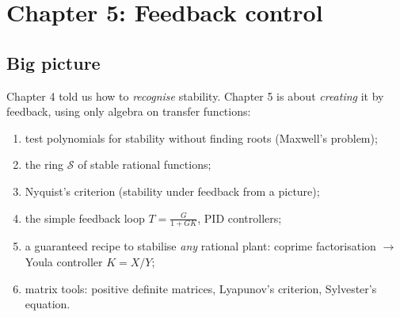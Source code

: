 \section{Chapter 5: Feedback control \texorpdfstring{}{}}
\label{ch5}

\subsection*{Big picture}
Chapter 4 told us how to \emph{recognise} stability. Chapter 5 is about \emph{creating} it by feedback, using only algebra on transfer functions:
\begin{enumerate}
\item test polynomials for stability without finding roots (Maxwell's problem);
\item the ring $\mathcal S$ of stable rational functions;
\item Nyquist's criterion (stability under feedback from a picture);
\item the simple feedback loop $T=\frac{G}{1+GK}$, PID controllers;
\item a guaranteed recipe to stabilise \emph{any} rational plant: coprime factorisation $\to$ Youla controller $K=X/Y$;
\item matrix tools: positive definite matrices, Lyapunov's criterion, Sylvester's equation.
\end{enumerate}

